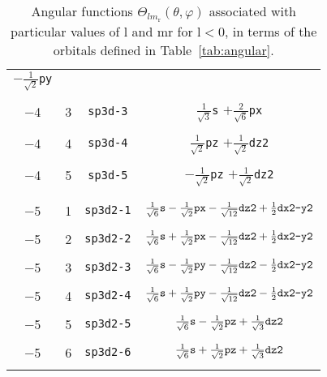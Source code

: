 \begin{table}
\begin{center}
\begin{tabular}{|cccc|}
$-\frac{1}{\sqrt{2}}$\verb#py#\\
&&&\\
 $-$4  &  3  &  \verb#sp3d-3#  &
$\frac{1}{\sqrt{3}}$\verb#s# $+\frac{2}{\sqrt{6}}$\verb#px#\\
&&&\\
 $-$4  &  4  &  \verb#sp3d-4#  & 
$\frac{1}{\sqrt{2}}$\verb#pz# $+\frac{1}{\sqrt{2}}$\verb#dz2#\\
&&&\\
 $-$4  &  5  &  \verb#sp3d-5#  & 
$-\frac{1}{\sqrt{2}}$\verb#pz# $+\frac{1}{\sqrt{2}}$\verb#dz2#\\
&&&\\\hline&&&\\
 $-$5  &  1  &  \verb#sp3d2-1# &   
$\frac{1}{\sqrt{6}}\verb#s#-\frac{1}{\sqrt{2}}\verb#px#
-\frac{1}{\sqrt{12}}\verb#dz2#+\frac{1}{2}\verb#dx2-y2#$ \\
&&&\\
 $-$5  &  2  &  \verb#sp3d2-2# &   
$\frac{1}{\sqrt{6}}\verb#s#+\frac{1}{\sqrt{2}}\verb#px#
-\frac{1}{\sqrt{12}}\verb#dz2#+\frac{1}{2}\verb#dx2-y2#$ \\
&&&\\
 $-$5  &  3  &  \verb#sp3d2-3# &   
$\frac{1}{\sqrt{6}}\verb#s#-\frac{1}{\sqrt{2}}\verb#py#
-\frac{1}{\sqrt{12}}\verb#dz2#-\frac{1}{2}\verb#dx2-y2#$ \\
&&&\\
 $-$5  &  4  &  \verb#sp3d2-4# &   
$\frac{1}{\sqrt{6}}\verb#s#+\frac{1}{\sqrt{2}}\verb#py#
-\frac{1}{\sqrt{12}}\verb#dz2#-\frac{1}{2}\verb#dx2-y2#$ \\
&&&\\
 $-$5  &  5  &  \verb#sp3d2-5# &   
$\frac{1}{\sqrt{6}}\verb#s#-\frac{1}{\sqrt{2}}\verb#pz#
+\frac{1}{\sqrt{3}}\verb#dz2#$ \\
&&&\\
 $-$5  &  6  &  \verb#sp3d2-6# &  
$\frac{1}{\sqrt{6}}\verb#s#+\frac{1}{\sqrt{2}}\verb#pz#
+\frac{1}{\sqrt{3}}\verb#dz2#$ \\
&&&\\\hline\hline
\end{tabular}
\caption{Angular functions
$\Theta_{lm_{\mathrm{r}}}(\theta,\varphi)$
associated with particular values of l and mr for
l$<0$, in terms of the orbitals defined in Table~\ref{tab:angular}.
\label{tab:hybrids}}
\end{center}
\end{table}


